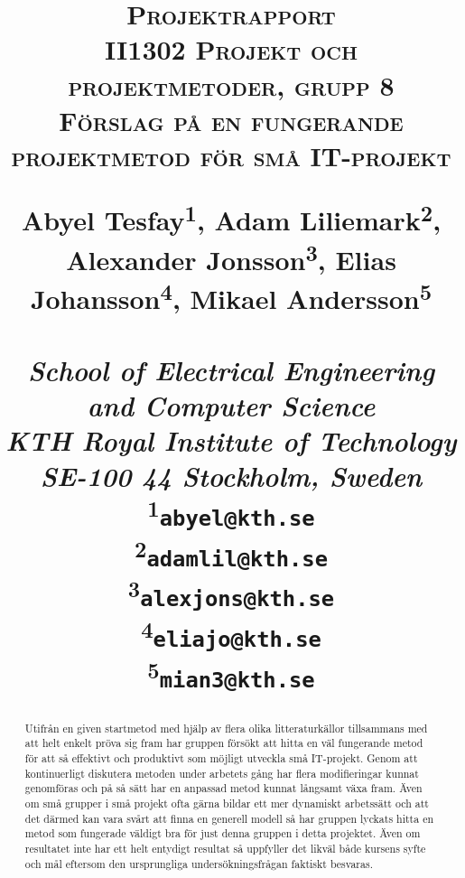 \documentclass[conference]{IEEEtran}
\begin{document}
\title{\textsc{
    Projektrapport\\
    II1302 Projekt och projektmetoder, grupp 8\\
{\large Förslag på en fungerande projektmetod för små IT-projekt}}

\begin{center}
    \large{ 
        Abyel Tesfay\textsuperscript{1}, Adam Liliemark\textsuperscript{2}, 
        Alexander Jonsson\textsuperscript{3}, Elias Johansson\textsuperscript{4}, 
        Mikael Andersson\textsuperscript{5}\\
        \textit{\\School of Electrical Engineering and Computer Science\\
                KTH Royal Institute of Technology\\
                SE-100 44 Stockholm, Sweden\\}
        \textsuperscript{1}\texttt{abyel@kth.se}\\
        \textsuperscript{2}\texttt{adamlil@kth.se}\\
        \textsuperscript{3}\texttt{alexjons@kth.se}\\
        \textsuperscript{4}\texttt{eliajo@kth.se}\\
        \textsuperscript{5}\texttt{mian3@kth.se}
    }
\end{center}
}

\author{}

\maketitle

\begin{abstract}
Utifrån en given startmetod med hjälp av flera olika litteraturkällor tillsammans med att helt enkelt pröva sig fram har gruppen försökt att hitta en väl fungerande metod för att så effektivt och produktivt som möjligt utveckla små IT-projekt. Genom att kontinuerligt diskutera metoden under arbetets gång har flera modifieringar kunnat genomföras och på så sätt har en anpassad metod kunnat långsamt växa fram. Även om små grupper i små projekt ofta gärna bildar ett mer dynamiskt arbetssätt och att det därmed kan vara svårt att finna en generell modell så har gruppen lyckats hitta en metod som fungerade väldigt bra för just denna gruppen i detta projektet. Även om resultatet inte har ett helt entydigt resultat så uppfyller det likväl både kursens syfte och mål eftersom den ursprungliga undersökningsfrågan faktiskt besvaras.
\end{abstract}
\end{document}
